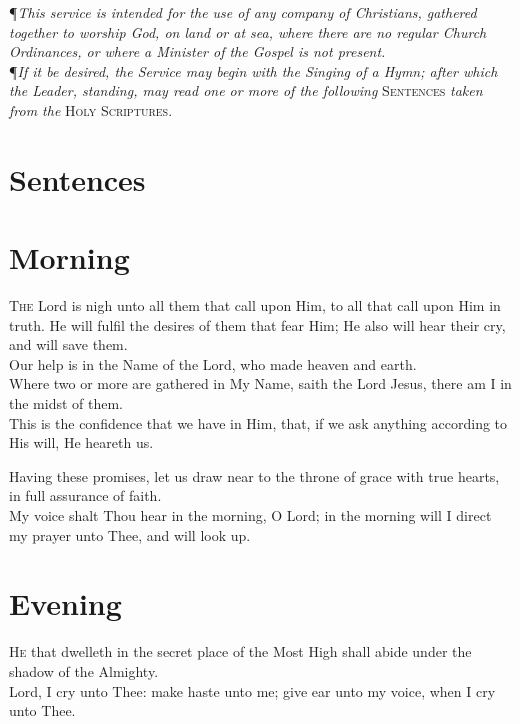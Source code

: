 \P \textit{This service is intended for the use of any company of Christians, gathered together to worship God, on land or at sea, where there are no regular Church Ordinances, or where a Minister of the Gospel is not present.} \\

\noindent\P\textit{If it be desired, the Service may begin with the Singing of a Hymn; after which the Leader, standing, may read one or more of the following} \textsc{Sentences} \textit{taken from the} \textsc{Holy Scriptures.}   

\section*{Sentences}
\section*{\normalsize Morning}

\lettrine{T}{he} Lord is nigh unto all them that call upon Him, to all that call upon Him in truth.
He will fulfil the desires of them that fear Him; He also will hear their cry, and will save them. \\

Our help is in the Name of the Lord, who made heaven and earth. \\

Where two or more are gathered in My Name, saith the Lord Jesus, there am I in the midst of them. \\

This is the confidence that we have in Him, that, if we ask anything according to His will, He heareth us.

Having these promises, let us draw near to the throne of grace with true hearts, in full assurance of faith. \\

My voice shalt Thou hear in the morning, O Lord; in the morning will I direct my prayer unto Thee, and will look up.

\section*{\normalsize Evening}

\lettrine{H}{e} that dwelleth in the secret place of the Most High shall abide under the shadow of the Almighty. \\

Lord, I cry unto Thee: make haste unto me; give ear unto my voice, when I cry unto Thee.


